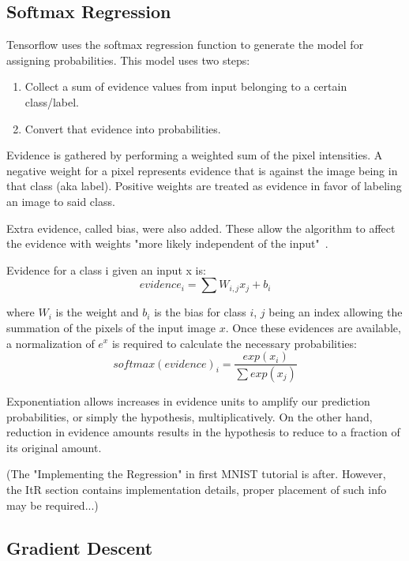 \documentclass[11pt]{article}
\begin{document}
\subsection{Softmax Regression}
Tensorflow uses the softmax regression function to generate the model for assigning probabilities.  This model uses two steps:
\begin{enumerate}
  \item Collect a sum of evidence values from input belonging to a certain class/label.
  \item Convert that evidence into probabilities.
\end{enumerate}
Evidence is gathered by performing a weighted sum of the pixel intensities.  A negative weight for a pixel represents evidence that is against the image being in that class (aka label).  Positive weights are treated as evidence in favor of labeling an image to said class.

Extra evidence, called bias, were also added.  These allow the algorithm to affect the evidence with weights "more likely independent of the input"~\cite{mnist-for-ml-beginners}.

Evidence for a class i given an input x is:
\begin{equation}
    evidence_{i} = \sum W_{i,j}x_{j} + b_{i}
\end{equation}


where $W_{i}$ is the weight and $b_{i}$ is the bias for class $i$, $j$ being an index allowing the summation of the pixels of the input image $x$.  
Once these evidences are available, a normalization of $e^x$ is required to calculate the necessary probabilities:
\begin{equation}
    softmax(evidence)_{i} = \frac{exp(x_{i})}{\sum exp(x_{j})}
\end{equation}

Exponentiation allows increases in evidence units to amplify our prediction probabilities, or simply the hypothesis, multiplicatively.  On the other hand, reduction in evidence amounts results in the hypothesis to reduce to a fraction of its original amount.

(The "Implementing the Regression" in first MNIST tutorial is after. However, the ItR section contains implementation details, proper placement of such info may be required...)


\subsection{Gradient Descent}
\end{document}

